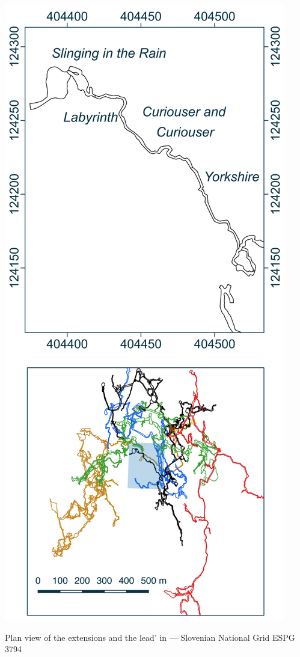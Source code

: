 \begin{marginfigure}
\checkoddpage \ifoddpage \forcerectofloat \else \forceversofloat \fi
\centering
 \includegraphics[width=\linewidth]{images/little_insets/labyrinth_inset.pdf}
 \caption{Plan view of the \protect{} extensions and the lead' in \protect{} --- Slovenian National Grid ESPG 3794}
\label{Labyrinth inset}
\end{marginfigure}

